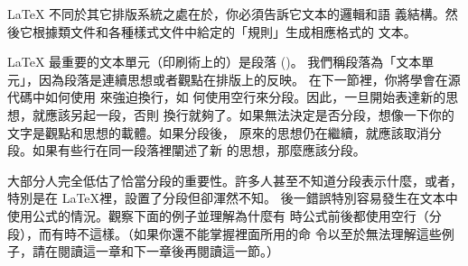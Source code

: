 \LaTeX{} 不同於其它排版系統之處在於，你必須告訴它文本的邏輯和語
義結構。然後它根據類文件和各種樣式文件中給定的「規則」生成相應格式的
文本。

\LaTeX{} 最重要的文本單元（印刷術上的）是段落 ()。
我們稱段落為「文本單元」，因為段落是連續思想或者觀點在排版上的反映。
在下一節裡，你將學會在源代碼中如何使用 \texttt{\bs\bs} 來強迫換行，如
何使用空行來分段。因此，一旦開始表達新的思想，就應該另起一段，否則
換行就夠了。如果無法決定是否分段，想像一下你的文字是觀點和思想的載體。如果分段後，
原來的思想仍在繼續，就應該取消分段。如果有些行在同一段落裡闡述了新
的思想，那麼應該分段。

大部分人完全低估了恰當分段的重要性。許多人甚至不知道分段表示什麼，或者，
特別是在 \LaTeX 裡，設置了分段但卻渾然不知。
後一錯誤特別容易發生在文本中使用公式的情況。觀察下面的例子並理解為什麼有
時公式前後都使用空行（分段），而有時不這樣。（如果你還不能掌握裡面所用的命
令以至於無法理解這些例子，請在閱讀這一章和下一章後再閱讀這一節。）


